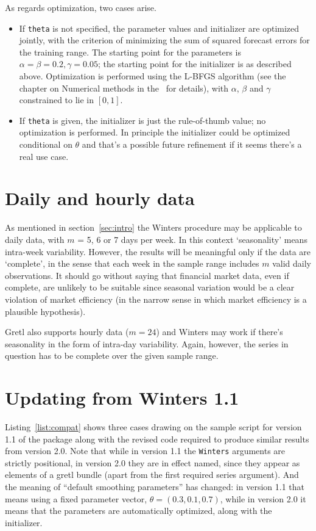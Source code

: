\documentclass{article}
\begin{document}
As regards optimization, two cases arise.
\begin{itemize}
\item If \texttt{theta} is not specified, the parameter values and
  initializer are optimized jointly, with the criterion of minimizing
  the sum of squared forecast errors for the training range. The
  starting point for the parameters is
  $\alpha = \beta = 0.2, \gamma = 0.05$; the starting point for the
  initializer is as described above. Optimization is performed using the
  L-BFGS algorithm (see the chapter on Numerical methods in the \GUG\
  for details), with $\alpha$, $\beta$ and $\gamma$ constrained to lie
  in $[0,1]$.
\item If \texttt{theta} is given, the initializer is just the
  rule-of-thumb value; no optimization is performed. In principle the
  initializer could be optimized conditional on $\theta$ and that's a
  possible future refinement if it seems there's a real use case.
\end{itemize}

\section{Daily and hourly data}
\label{sec:daily}

As mentioned in section~\ref{sec:intro} the Winters procedure may be
applicable to daily data, with $m$ = 5, 6 or 7 days per week. In this
context `seasonality' means intra-week variability. However, the results
will be meaningful only if the data are `complete', in the sense that
each week in the sample range includes $m$ valid daily observations. It
should go without saying that financial market data, even if complete,
are unlikely to be suitable since seasonal variation would be a clear
violation of market efficiency (in the narrow sense in which market
efficiency is a plausible hypothesis).

Gretl also supports hourly data ($m=24$) and Winters may work if there's
seasonality in the form of intra-day variability. Again, however, the
series in question has to be complete over the given sample range.

\section{Updating from Winters 1.1}
\label{sec:update}

Listing~\ref{list:compat} shows three cases drawing on the sample
script for version 1.1 of the package along with the revised code
required to produce similar results from version 2.0. Note that while
in version 1.1 the \texttt{Winters} arguments are strictly positional,
in version 2.0 they are in effect named, since they appear as elements
of a gretl bundle (apart from the first required series argument). And
the meaning of ``default smoothing parameters'' has changed: in
version 1.1 that means using a fixed parameter vector,
$\theta = (0.3, 0.1, 0.7)$, while in version 2.0 it means that the
parameters are automatically optimized, along with the initializer.
\end{document}
